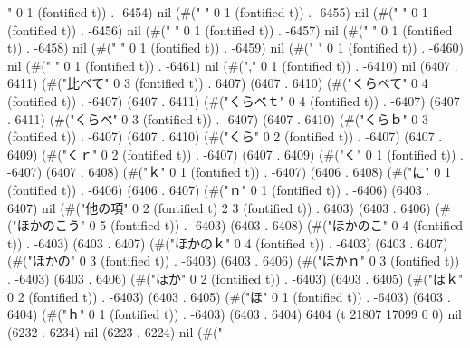 " 0 1 (fontified t)) . -6454) nil (#(" " 0 1 (fontified t)) . -6455) nil (#(" " 0 1 (fontified t)) . -6456) nil (#(" " 0 1 (fontified t)) . -6457) nil (#(" " 0 1 (fontified t)) . -6458) nil (#(" " 0 1 (fontified t)) . -6459) nil (#(" " 0 1 (fontified t)) . -6460) nil (#(" " 0 1 (fontified t)) . -6461) nil (#("," 0 1 (fontified t)) . -6410) nil (6407 . 6411) (#("比べて" 0 3 (fontified t)) . 6407) (6407 . 6410) (#("くらべて" 0 4 (fontified t)) . -6407) (6407 . 6411) (#("くらべｔ" 0 4 (fontified t)) . -6407) (6407 . 6411) (#("くらべ" 0 3 (fontified t)) . -6407) (6407 . 6410) (#("くらｂ" 0 3 (fontified t)) . -6407) (6407 . 6410) (#("くら" 0 2 (fontified t)) . -6407) (6407 . 6409) (#("くｒ" 0 2 (fontified t)) . -6407) (6407 . 6409) (#("く" 0 1 (fontified t)) . -6407) (6407 . 6408) (#("ｋ" 0 1 (fontified t)) . -6407) (6406 . 6408) (#("に" 0 1 (fontified t)) . -6406) (6406 . 6407) (#("ｎ" 0 1 (fontified t)) . -6406) (6403 . 6407) nil (#("他の項" 0 2 (fontified t) 2 3 (fontified t)) . 6403) (6403 . 6406) (#("ほかのこう" 0 5 (fontified t)) . -6403) (6403 . 6408) (#("ほかのこ" 0 4 (fontified t)) . -6403) (6403 . 6407) (#("ほかのｋ" 0 4 (fontified t)) . -6403) (6403 . 6407) (#("ほかの" 0 3 (fontified t)) . -6403) (6403 . 6406) (#("ほかｎ" 0 3 (fontified t)) . -6403) (6403 . 6406) (#("ほか" 0 2 (fontified t)) . -6403) (6403 . 6405) (#("ほｋ" 0 2 (fontified t)) . -6403) (6403 . 6405) (#("ほ" 0 1 (fontified t)) . -6403) (6403 . 6404) (#("ｈ" 0 1 (fontified t)) . -6403) (6403 . 6404) 6404 (t 21807 17099 0 0) nil (6232 . 6234) nil (6223 . 6224) nil (#("
